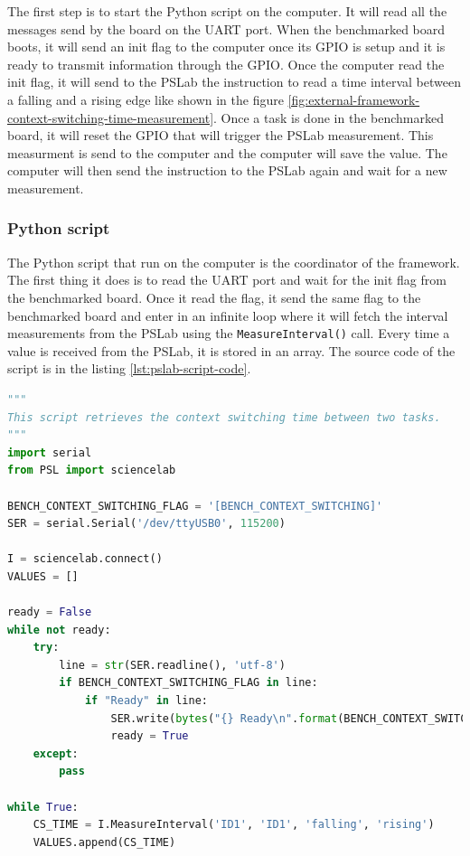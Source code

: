 The first step is to start the Python script on the computer. It will read all the messages send by the board on the UART port.
When the benchmarked board boots, it will send an init flag to the computer once its GPIO is setup and it is ready to transmit information through the GPIO.
Once the computer read the init flag, it will send to the PSLab the instruction to read a time interval between a falling and a rising edge like shown in the figure \ref{fig:external-framework-context-switching-time-measurement}.
Once a task is done in the benchmarked board, it will reset the GPIO that will trigger the PSLab measurement.
This measurment is send to the computer and the computer will save the value.
The computer will then send the instruction to the PSLab again and wait for a new measurement.

\subsubsection{Python script}

The Python script that run on the computer is the coordinator of the framework.
The first thing it does is to read the UART port and wait for the init flag from the benchmarked board.
Once it read the flag, it send the same flag to the benchmarked board and enter in an infinite loop where it will fetch the interval measurements from the PSLab using the \texttt{MeasureInterval()} call.
Every time a value is received from the PSLab, it is stored in an array.
The source code of the script is in the listing \ref{lst:pslab-script-code}.

\begin{lstlisting}[style=CStyle, float, language=python, label={lst:pslab-script-code}, caption={Python script source code}]
"""
This script retrieves the context switching time between two tasks.
"""
import serial
from PSL import sciencelab

BENCH_CONTEXT_SWITCHING_FLAG = '[BENCH_CONTEXT_SWITCHING]' 
SER = serial.Serial('/dev/ttyUSB0', 115200)

I = sciencelab.connect()
VALUES = []

ready = False
while not ready:
    try:
        line = str(SER.readline(), 'utf-8')
        if BENCH_CONTEXT_SWITCHING_FLAG in line:
            if "Ready" in line:
                SER.write(bytes("{} Ready\n".format(BENCH_CONTEXT_SWITCHING_FLAG), 'utf-8'))
                ready = True
    except:
        pass

while True:
    CS_TIME = I.MeasureInterval('ID1', 'ID1', 'falling', 'rising')
    VALUES.append(CS_TIME)
\end{lstlisting}

